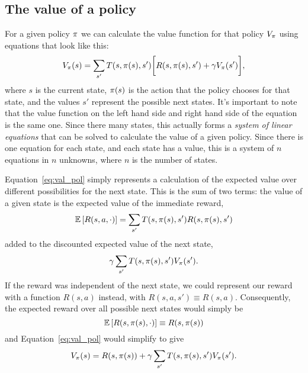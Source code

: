 \documentclass[a4paper]{article}
\begin{document}
\subsection{The value of a policy} \label{ssec:val_pol}
For a given policy $\pi$ we can calculate the value function for
that policy $V_\pi$ using equations that look like this:
\begin{equation} \label{eq:val_pol}
  V_\pi(s) = \sum_{s'} T(s, \pi(s), s') \bigg[ R(s, \pi(s), s') + \gamma V_\pi(s') \bigg] ,
\end{equation}
where $s$ is the current state, $\pi(s)$ is the action that the policy
chooses for that state, and the values $s'$ represent the possible next states.
It's important to note that the value function on the left hand side and right
hand side of the equation is the same one.
Since there many states,
this actually forms a \emph{system of linear equations} that can be solved to
calculate the value of a given policy.
Since there is one equation for each state, and each state has a value,
this is a system of $n$ equations in $n$ unknowns, where $n$ is the number of
states.

Equation~\ref{eq:val_pol} simply represents a calculation of the expected value
over different possibilities for the next state.
This is the sum of two terms:
the value of a given state is the expected value of the immediate reward,
\begin{equation} \label{eq:e_rew}
  \mathbb{E} \left[{R(s, a, \cdot)}\right] = \sum_{s'} T(s, \pi(s), s') R(s, \pi(s), s')
\end{equation}
added to the discounted expected value of the next state,
\begin{equation}
  \gamma \sum_{s'} T(s, \pi(s), s') V_\pi(s') .
\end{equation}
If the reward was independent of the next state, we could represent
our reward with a function $R(s, a)$ instead,
with $R(s, a, s') \equiv R(s, a)$.
Consequently, the expected reward over all possible next states
would simply be
\begin{equation*}
  \mathbb{E} \left[{R(s, \pi(s), \cdot)}\right] \equiv R(s, \pi(s))
\end{equation*}
and Equation~\ref{eq:val_pol} would
simplify to give
\begin{equation} \label{eq:val_rsa}
  V_\pi(s) = R(s, \pi(s)) + \gamma \sum_{s'} T(s, \pi(s), s') V_\pi(s') .
\end{equation}
\end{document}

